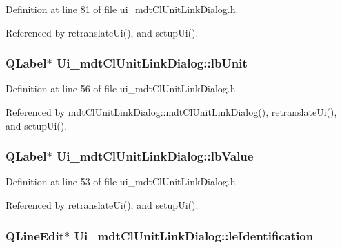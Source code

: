 Definition at line 81 of file ui\-\_\-mdt\-Cl\-Unit\-Link\-Dialog.\-h.



Referenced by retranslate\-Ui(), and setup\-Ui().

\hypertarget{class_ui__mdt_cl_unit_link_dialog_ac5ea1fe529ad3b837ed545c823f81e92}{
\subsubsection[{lb\-Unit}]{\setlength{\rightskip}{0pt plus 5cm}Q\-Label$\ast$ Ui\-\_\-mdt\-Cl\-Unit\-Link\-Dialog\-::lb\-Unit}}\label{class_ui__mdt_cl_unit_link_dialog_ac5ea1fe529ad3b837ed545c823f81e92}


Definition at line 56 of file ui\-\_\-mdt\-Cl\-Unit\-Link\-Dialog.\-h.



Referenced by mdt\-Cl\-Unit\-Link\-Dialog\-::mdt\-Cl\-Unit\-Link\-Dialog(), retranslate\-Ui(), and setup\-Ui().

\hypertarget{class_ui__mdt_cl_unit_link_dialog_a923599f5b3f89437483b1a396f6036d9}{
\subsubsection[{lb\-Value}]{\setlength{\rightskip}{0pt plus 5cm}Q\-Label$\ast$ Ui\-\_\-mdt\-Cl\-Unit\-Link\-Dialog\-::lb\-Value}}\label{class_ui__mdt_cl_unit_link_dialog_a923599f5b3f89437483b1a396f6036d9}


Definition at line 53 of file ui\-\_\-mdt\-Cl\-Unit\-Link\-Dialog.\-h.



Referenced by retranslate\-Ui(), and setup\-Ui().

\hypertarget{class_ui__mdt_cl_unit_link_dialog_a17fea8e34e0496a1dd5ed10091673f2a}{
\subsubsection[{le\-Identification}]{\setlength{\rightskip}{0pt plus 5cm}Q\-Line\-Edit$\ast$ Ui\-\_\-mdt\-Cl\-Unit\-Link\-Dialog\-::le\-Identification}}\label{class_ui__mdt_cl_unit_link_dialog_a17fea8e34e0496a1dd5ed10091673f2a}


